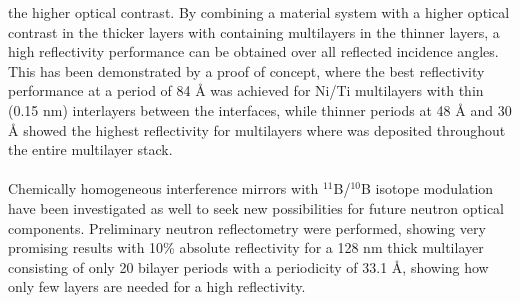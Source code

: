 the higher optical contrast. By combining a material system with a higher optical contrast in the thicker layers with \BC containing multilayers in the thinner layers, a high reflectivity performance can be obtained over all reflected incidence angles. This has been demonstrated by a proof of concept, where the best reflectivity performance at a period of 84 Å was achieved for Ni/Ti multilayers with thin (0.15 nm) \BC interlayers between the interfaces, while thinner periods at 48 Å and 30 Å showed the highest reflectivity for multilayers where \BC was deposited throughout the entire multilayer stack. \\
\\ Chemically  homogeneous  \natBC interference mirrors with  $^\textrm{11}$B/$^\textrm{10}$B  isotope modulation have been investigated as well to seek new possibilities for future neutron optical components. Preliminary neutron reflectometry were performed, showing very promising results with 10\% absolute reflectivity for a 128 nm thick multilayer consisting of only 20 bilayer periods with a periodicity of 33.1 Å, showing how only few layers are needed for a high reflectivity. 
